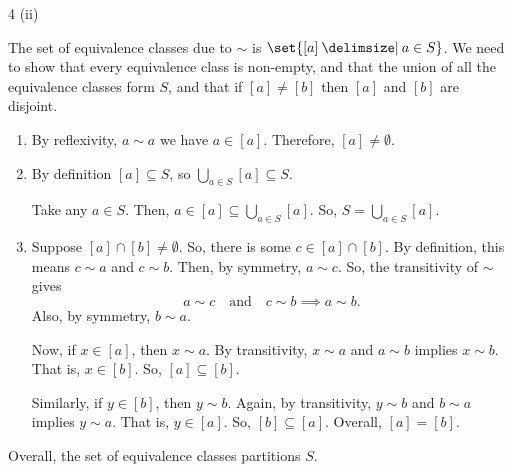 \documentclass[11pt]{penrose}
\begin{document}
\begin{problem}{4 (ii)}

    The set of equivalence classes due to $\sim$ is $\set{[a] \st a \in S}$. We need to show that every equivalence class is non-empty, and that the union of all the equivalence classes form $S$, and that if $[a] \neq [b]$ then $[a]$ and $[b]$ are disjoint.
    \begin{enumerate}
        \item By reflexivity, $a \sim a$ we have $a \in [a]$. Therefore, $[a] \neq \emptyset$.

        \item By definition $[a] \subseteq S$, so $\bigcup_{a \in S} [a] \subseteq S$.

        Take any $a \in S$. Then, $a \in [a] \subseteq \bigcup_{a \in S} [a]$. So, $S = \bigcup_{a \in S} [a]$.

        \item Suppose $[a] \cap [b] \neq \emptyset$. So, there is some $c \in [a] \cap [b]$. By definition, this means $c \sim a$ and $c \sim b$. Then, by symmetry, $a \sim c$. So, the transitivity of $\sim$ gives
        \begin{equation*}
            a \sim c \quad\text{and}\quad c \sim b \implies a \sim b.
        \end{equation*}
        Also, by symmetry, $b \sim a$.

        Now, if $x \in [a]$, then $x \sim a$. By transitivity, $x \sim a$ and $a \sim b$ implies $x \sim b$. That is, $x \in [b]$. So, $[a] \subseteq [b]$.

        Similarly, if $y \in [b]$, then $y \sim b$. Again, by transitivity, $y \sim b$ and $b \sim a$ implies $y \sim a$. That is, $y \in [a]$. So, $[b] \subseteq [a]$. Overall, $[a] = [b]$.
    \end{enumerate}

    Overall, the set of equivalence classes partitions $S$.
\end{problem}
\end{document}
